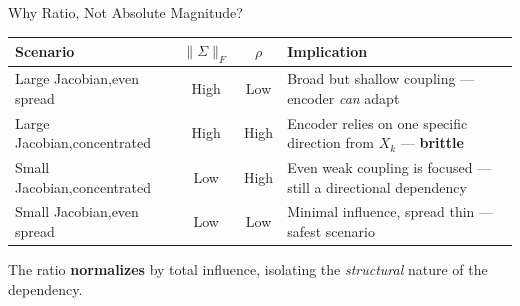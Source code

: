 \documentclass[aspectratio=169, 11pt]{beamer}
\begin{document}
\begin{frame}{Why Ratio, Not Absolute Magnitude?}
  \begin{center}
    \renewcommand{\arraystretch}{1.4}
    \begin{tabular}{>{\footnotesize}p{3.2cm} >{\footnotesize}c >{\footnotesize}c >{\footnotesize}p{5cm}}
      \toprule
      \textbf{Scenario} & $\|\Sigma\|_F$ & $\rho$ & \textbf{Implication} \\
      \midrule
      Large Jacobian,\newline even spread & High & \textcolor{softgreen}{Low} & Broad but shallow coupling — encoder \emph{can} adapt \\
      \rowcolor{hlrow}
      Large Jacobian,\newline concentrated & High & \textcolor{accentred}{High} & Encoder relies on one specific direction from $X_k$ — \textbf{brittle} \\
      Small Jacobian,\newline concentrated & Low & \textcolor{accentred}{High} & Even weak coupling is focused — still a directional dependency \\
      \rowcolor{hlrow}
      Small Jacobian,\newline even spread & Low & \textcolor{softgreen}{Low} & Minimal influence, spread thin — safest scenario \\
      \bottomrule
    \end{tabular}
  \end{center}
  \vspace{0.3cm}
  {\footnotesize The ratio \textbf{normalizes} by total influence, isolating the \emph{structural} nature of the dependency.}
\end{frame}
\end{document}
